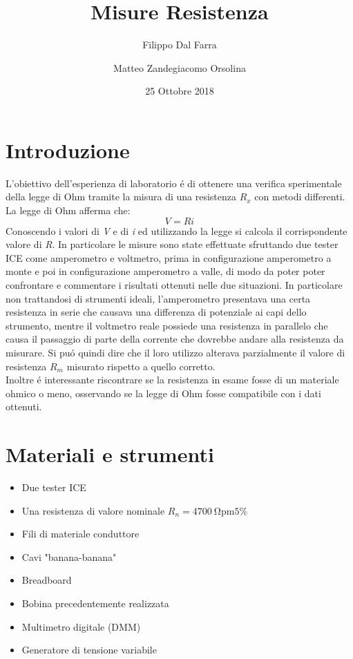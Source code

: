 \documentclass{article}
\title{Misure Resistenza}
\author{Filippo Dal Farra \and Matteo Zandegiacomo Orsolina}
\date{25 Ottobre 2018}
\begin{document}
\maketitle

\newpage

\section{Introduzione}
L'obiettivo dell'esperienza di laboratorio \'e di ottenere una verifica sperimentale della legge di Ohm tramite la misura di una resistenza $R_x$ con metodi differenti.\\
La legge di Ohm afferma che: 
\begin{equation}
    V = R i
    \label{eq:Ohm}
\end{equation}
Conoscendo i valori di \textit{V} e di \textit{i} ed utilizzando la legge si calcola il corrispondente valore di \textit{R}. In particolare le misure sono state effettuate sfruttando due tester ICE come amperometro e voltmetro, prima in configurazione amperometro a monte e poi in configurazione amperometro a valle, di modo da poter poter confrontare e commentare i risultati ottenuti nelle due situazioni. In particolare non trattandosi di strumenti ideali, l'amperometro presentava una certa resistenza in serie che causava una differenza di potenziale ai capi dello strumento, mentre il voltmetro reale possiede una resistenza in parallelo che causa il passaggio di parte della corrente che dovrebbe andare alla resistenza da misurare. Si pu\'o quindi dire che il loro utilizzo alterava parzialmente il valore di resistenza $R_m$ misurato rispetto a quello corretto.\\
Inoltre \'e interessante riscontrare se la resistenza in esame fosse di un materiale ohmico o meno, osservando se la legge di Ohm fosse compatibile con i dati ottenuti.\\

\newpage

\section{Materiali e strumenti}

\begin{itemize}
  \item Due tester ICE
  \item Una resistenza di valore nominale $R_{n}= \SI{4700}{\ohm \pm 5\percent}$
  \item Fili di materiale conduttore
  \item Cavi "banana-banana"
  \item Breadboard
  \item Bobina precedentemente realizzata
  \item Multimetro digitale (DMM)
  \item Generatore di tensione variabile
\end{itemize}
\end{document}
